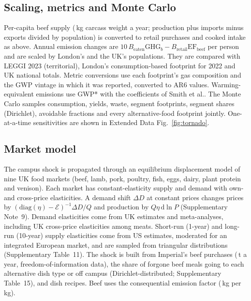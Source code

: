 \documentclass[10pt]{article}
\begin{document}
\subsection{Scaling, metrics and Monte Carlo}
Per-capita beef supply (\CweKg{}\,kg carcass weight a year; production plus imports minus exports divided
by population\cite{defra2025auk,ons2025pop}) is converted to retail purchases and cooked intake as above.
Annual emission changes are $10\,B_{\mathrm{eaten}}\mathrm{GHG}_b - B_{\mathrm{retail}}\mathrm{EF}_{\mathrm{beef}}$
per person and are scaled by London's and the UK's populations. They are compared with LEGGI 2023
(territorial)\cite{leggi2025}, London's consumption-based footprint for 2022\cite{gla2024cbe} and UK national
totals\cite{desnz2026ghg}. Metric conversions use each footprint's gas composition and the GWP vintage
in which it was reported, converted to AR6 values\cite{forster2021ar6}. Warming-equivalent emissions use
GWP* with the coefficients of Smith et al.\cite{smith2021gwpstar}. The Monte Carlo samples consumption,
yields, waste, segment footprints, segment shares (Dirichlet), avoidable fractions and every
alternative-food footprint jointly. One-at-a-time sensitivities are shown in Extended Data Fig.~\ref{fig:tornado}.

\subsection{Market model}
The campus shock is propagated through an equilibrium displacement model of nine UK food markets
(beef, lamb, pork, poultry, fish, eggs, dairy, plant protein and venison)\cite{alston1995science,wohlgenant1993}.
Each market has constant-elasticity supply and demand with own- and cross-price elasticities. A
demand shift $\Delta D$ at constant prices changes prices by $(\mathrm{diag}(\eta)-\mathcal{E})^{-1}\Delta D/Q$
and production by $Q\eta\,\mathrm{d}\ln P$ (Supplementary Note~9). Demand elasticities come from UK
estimates and meta-analyses\cite{tiffin2011,andreyeva2010,gallet2010}, including UK cross-price
elasticities among meats\cite{tiffin2011}. Short-run (1-year) and long-run (10-year) supply elasticities
come from US estimates\cite{usda2015cool,suh2017}, moderated for an integrated European market, and are
sampled from triangular distributions (Supplementary Table~11). The shock is built from Imperial's
beef purchases (\CampusBeefT{}\,t a year, freedom-of-information data\cite{imperialfoi}), the share of
forgone beef meals going to each alternative dish type or off campus (Dirichlet-distributed;
Supplementary Table~15), and dish recipes. Beef uses the consequential emission factor
(\CampusEfConseq{}\,kg \COtwoe{} per kg).
\end{document}
